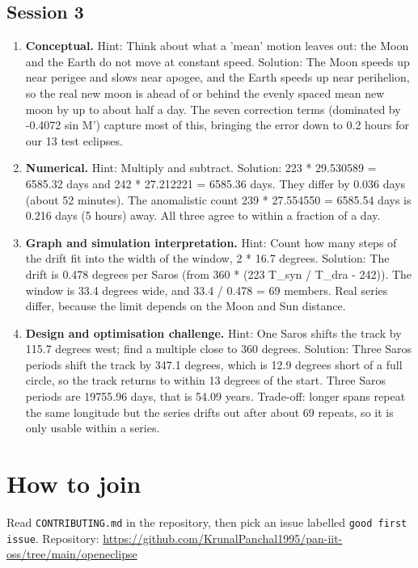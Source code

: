 \documentclass[11pt,a4paper]{article}
\begin{document}
\subsection*{Session 3}
\begin{enumerate}[nosep]
\item \textbf{Conceptual.} Hint: Think about what a 'mean' motion leaves out: the Moon and the Earth do not move at constant speed. Solution: The Moon speeds up near perigee and slows near apogee, and the Earth speeds up near perihelion, so the real new moon is ahead of or behind the evenly spaced mean new moon by up to about half a day. The seven correction terms (dominated by -0.4072 sin M') capture most of this, bringing the error down to 0.2 hours for our 13 test eclipses.
\item \textbf{Numerical.} Hint: Multiply and subtract. Solution: 223 * 29.530589 = 6585.32 days and 242 * 27.212221 = 6585.36 days. They differ by 0.036 days (about 52 minutes). The anomalistic count 239 * 27.554550 = 6585.54 days is 0.216 days (5 hours) away. All three agree to within a fraction of a day.
\item \textbf{Graph and simulation interpretation.} Hint: Count how many steps of the drift fit into the width of the window, 2 * 16.7 degrees. Solution: The drift is 0.478 degrees per Saros (from 360 * (223 T\_syn / T\_dra - 242)). The window is 33.4 degrees wide, and 33.4 / 0.478 = 69 members. Real series differ, because the limit depends on the Moon and Sun distance.
\item \textbf{Design and optimisation challenge.} Hint: One Saros shifts the track by 115.7 degrees west; find a multiple close to 360 degrees. Solution: Three Saros periods shift the track by 347.1 degrees, which is 12.9 degrees short of a full circle, so the track returns to within 13 degrees of the start. Three Saros periods are 19755.96 days, that is 54.09 years. Trade-off: longer spans repeat the same longitude but the series drifts out after about 69 repeats, so it is only usable within a series.
\end{enumerate}

\section{How to join}
Read \texttt{CONTRIBUTING.md} in the repository, then pick an issue labelled \texttt{good first issue}. Repository: \url{https://github.com/KrunalPanchal1995/pan-iit-oss/tree/main/openeclipse}
\end{document}
